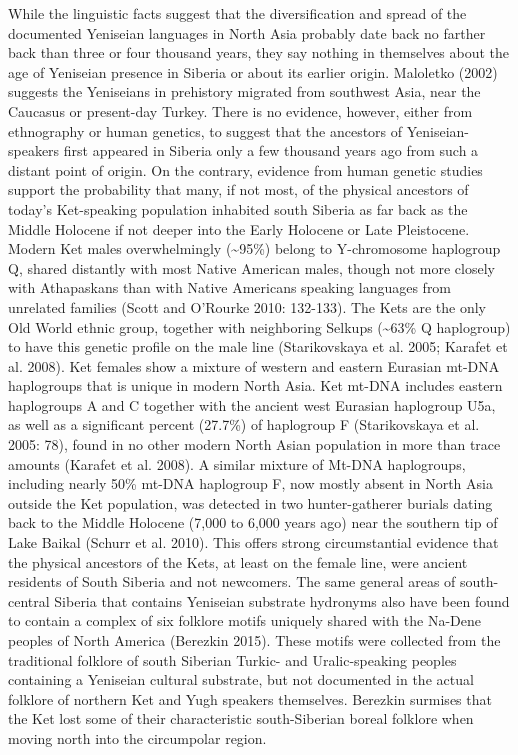 While the linguistic facts suggest that the diversification and spread of the documented Yeniseian languages in North Asia probably date back no farther back than three or four thousand years, they say nothing in themselves about the age of Yeniseian presence in Siberia or about its earlier origin. Maloletko (2002) suggests the Yeniseians in prehistory migrated from southwest Asia, near the Caucasus or present-day Turkey. There is no evidence, however, either from ethnography or human genetics, to suggest that the ancestors of Yeniseian-speakers first appeared in Siberia only a few thousand years ago from such a distant point of origin. On the contrary, evidence from human genetic studies support the probability that many, if not most, of the physical ancestors of today’s Ket-speaking population inhabited south Siberia as far back as the Middle Holocene if not deeper into the Early Holocene or Late Pleistocene. Modern Ket males overwhelmingly (\~{}95\%) belong to Y-chromosome haplogroup Q, shared distantly with most Native American males, though not more closely with Athapaskans than with Native Americans speaking languages from unrelated families (Scott and O’Rourke 2010: 132-133). The Kets are the only Old World ethnic group, together with neighboring Selkups (\~{}63\% Q haplogroup) to have this genetic profile on the male line (Starikovskaya et al. 2005; Karafet et al. 2008). Ket females show a mixture of western and eastern Eurasian mt-DNA haplogroups that is unique in modern North Asia. Ket mt-DNA includes eastern haplogroups A and C together with the ancient west Eurasian haplogroup U5a, as well as a significant percent (27.7\%) of haplogroup F (Starikovskaya et al. 2005: 78), found in no other modern North Asian population in more than trace amounts (Karafet et al. 2008). A similar mixture of Mt-DNA haplogroups, including nearly 50\% mt-DNA haplogroup F, now mostly absent in North Asia outside the Ket population, was detected in two hunter-gatherer burials dating back to the Middle Holocene (7,000 to 6,000 years ago) near the southern tip of Lake Baikal (Schurr et al. 2010). This offers strong circumstantial evidence that the physical ancestors of the Kets, at least on the female line, were ancient residents of South Siberia and not newcomers. The same general areas of south-central Siberia that contains Yeniseian substrate hydronyms also have been found to contain a complex of six folklore motifs uniquely shared with the Na-Dene peoples of North America (Berezkin 2015). These motifs were collected from the traditional folklore of south Siberian Turkic- and Uralic-speaking peoples containing a Yeniseian cultural substrate, but not documented in the actual folklore of northern Ket and Yugh speakers themselves. Berezkin surmises that the Ket lost some of their characteristic south-Siberian boreal folklore when moving north into the circumpolar region.

